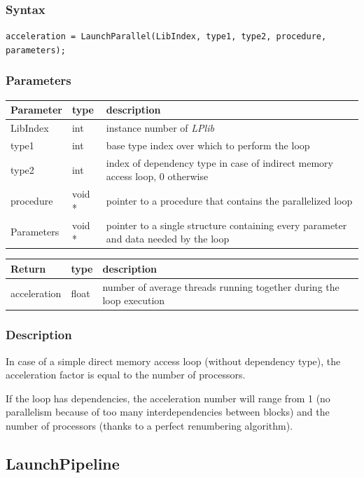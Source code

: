 \documentclass[a4paper,12pt]{article}
\begin{document}
\subsubsection*{Syntax}
\tt{acceleration = LaunchParallel(LibIndex, type1, type2, procedure, parameters);}
\normalfont

\subsubsection*{Parameters}
\begin{tabular}{|m{2cm}|m{1.5cm}|m{10.5cm}|}
\hline
Parameter  & type   & description \\
\hline
LibIndex   & int    & instance number of \emph{LPlib} \\
\hline
type1      & int    & base type index over which to perform the loop \\
\hline
type2      & int    & index of dependency type in case of indirect memory access loop, 0 otherwise \\
\hline
procedure  & void * & pointer to a procedure that contains the parallelized loop \\
\hline
Parameters & void * & pointer to a single structure containing every parameter and data needed by the loop \\
\hline
\end{tabular}

\medskip

\noindent
\begin{tabular}{|m{2cm}|m{1.5cm}|m{10.5cm}|}
\hline
Return     & type   & description \\
\hline
acceleration & float & number of average threads running together during the loop execution \\
\hline
\end{tabular}

\subsubsection*{Description}
In case of a simple direct memory access loop (without dependency type), the acceleration factor is equal to the number of processors.

If the loop has dependencies, the acceleration number will range from 1 (no parallelism because of too many interdependencies between blocks) and the number of processors (thanks to a perfect renumbering algorithm).


\subsection{LaunchPipeline}
\end{document}
